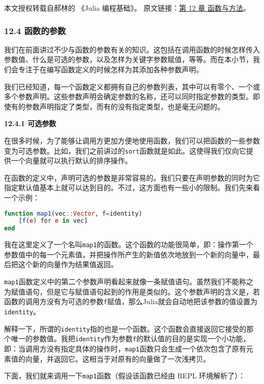 
本文授权转载自郝林的 《Julia 编程基础》。 原文链接：\href{https://github.com/hyper0x/JuliaBasics/blob/master/book/ch12.md}{第 12 章 函数与方法}。

\subsubsection{12.4 函数的参数}

我们在前面讲过不少与函数的参数有关的知识。这包括在调用函数的时候怎样传入参数值、什么是可选的参数，以及怎样为关键字参数赋值，等等。而在本小节，我们会专注于在编写函数定义的时候怎样为其添加各种参数声明。

我们已经知道，每一个函数定义都拥有自己的参数列表，其中可以有零个、一个或多个参数声明。这些参数声明会确定参数的名称，还可以同时指定参数的类型。即使有的参数声明指定了类型，而有的没有指定类型，也是毫无问题的。

\textbf{12.4.1 可选参数}

在很多时候，为了能够让调用方更加方便地使用函数，我们可以把函数的一些参数变为可选参数。比如，我们之前讲过的\verb|sort|函数就是如此。这使得我们仅向它提供一个向量就可以执行默认的排序操作。

在函数的定义中，声明可选的参数是非常容易的。我们只要在声明参数的同时为它指定默认值基本上就可以达到目的。不过，这方面也有一些小的限制。我们先来看一个示例：

\begin{lstlisting}[language=julia]
function map1(vec::Vector, f=identity)
    [f(e) for e in vec]
end
\end{lstlisting}

我在这里定义了一个名叫\verb|map1|的函数。这个函数的功能很简单，即：操作第一个参数值中的每一个元素值，并把操作所产生的新值依次地放到一个新的向量中，最后把这个新的向量作为结果值返回。

\verb|map1|函数定义中的第二个参数声明看起来就像一条赋值语句。虽然我们不能称之为赋值语句，但是它与赋值语句起到的作用是类似的。这个参数声明的含义是，若函数的调用方没有为可选的参数\verb|f|赋值，那么Julia就会自动地把该参数的值设置为\verb|identity|。

解释一下，所谓的\verb|identity|指的也是一个函数。这个函数会直接返回它接受的那个唯一的参数值。我把\verb|identity|作为参数\verb|f|的默认值的目的是实现一个小功能，即：当调用方没有指定具体的操作时，\verb|map1|函数只会生成一个依次包含了原有元素值的向量，并返回它。这相当于对原有的向量做了一次浅拷贝。

下面，我们就来调用一下\verb|map1|函数（假设该函数已经由 REPL 环境解析了）：

